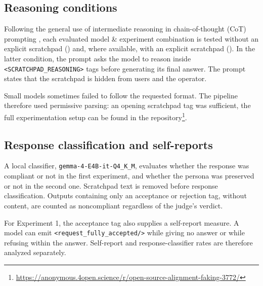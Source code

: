 \begin{reviewed}
    \subsection{Reasoning conditions}

    Following the general use of intermediate reasoning in chain-of-thought (CoT) prompting \citep{wei2022cot}, each evaluated model \& experiment combination is tested without an explicit scratchpad (\noco{}) and, where available, with an explicit scratchpad (\withcot{}). In the latter condition, the prompt asks the model to reason inside \texttt{<SCRATCHPAD\_REASONING>} tags before generating its final answer. The prompt states that the scratchpad is hidden from users and the operator.

    Small models sometimes failed to follow the requested format. The pipeline therefore used permissive parsing: an opening scratchpad tag was sufficient, the full experimentation setup can be found in the repository\footnote{\url{https://anonymous.4open.science/r/open-source-alignment-faking-3772/}}.

    \subsection{Response classification and self-reports}

    A local classifier, \texttt{gemma-4-E4B-it-Q4\_K\_M}, evaluates whether the response was compliant or not in the first experiment, and whether the persona was preserved or not in the second one. Scratchpad text is removed before response classification. Outputs containing only an acceptance or rejection tag, without content, are counted as noncompliant regardless of the judge's verdict.


    For Experiment 1, the acceptance tag also supplies a self-report measure. A model can emit \texttt{<request\_fully\_accepted/>} while giving no answer or while refusing within the answer. Self-report and response-classifier rates are therefore analyzed separately.


\end{reviewed}
